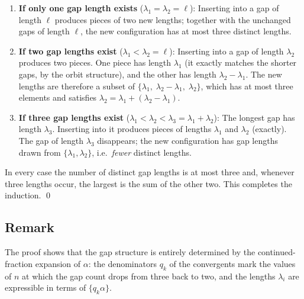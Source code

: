\begin{enumerate}
  \item \textbf{If only one gap length exists} ($\lambda_1 = \lambda_2 = \ell$):
        Inserting into a gap of length $\ell$ produces pieces of two new lengths;
        together with the unchanged gaps of length $\ell$, the new configuration
        has at most three distinct lengths.

  \item \textbf{If two gap lengths exist} ($\lambda_1 < \lambda_2 = \ell$):
        Inserting into a gap of length $\lambda_2$ produces two pieces. One piece
        has length $\lambda_1$ (it exactly matches the shorter gaps, by the
        orbit structure), and the other has length $\lambda_2 - \lambda_1$.
        The new lengths are therefore a subset of
        $\{\lambda_1,\; \lambda_2 - \lambda_1,\; \lambda_2\}$,
        which has at most three elements and satisfies
        $\lambda_2 = \lambda_1 + (\lambda_2 - \lambda_1)$.

  \item \textbf{If three gap lengths exist} ($\lambda_1 < \lambda_2 < \lambda_3 = \lambda_1 + \lambda_2$):
        The longest gap has length $\lambda_3$. Inserting into it produces pieces
        of lengths $\lambda_1$ and $\lambda_2$ (exactly). The gap of length
        $\lambda_3$ disappears; the new configuration has gap lengths drawn from
        $\{\lambda_1, \lambda_2\}$, i.e.\ \emph{fewer} distinct lengths.
\end{enumerate}

In every case the number of distinct gap lengths is at most three and, whenever
three lengths occur, the largest is the sum of the other two. This completes the
induction. \qed

\subsection*{Remark}

The proof shows that the gap structure is entirely determined by the
continued-fraction expansion of $\alpha$: the denominators $q_k$ of the
convergents mark the values of $n$ at which the gap count drops from three back
to two, and the lengths $\lambda_i$ are expressible in terms of $\{q_k \alpha\}$.
